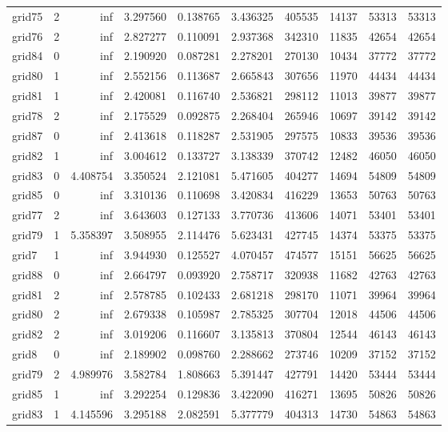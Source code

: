 \begin{longtable}{|l|r|r|r|r|r|r|r|r|r|}
grid75 & 2 & inf & 3.297560 & 0.138765 & 3.436325 & 405535 & 14137 & 53313 & 53313 \\
grid76 & 2 & inf & 2.827277 & 0.110091 & 2.937368 & 342310 & 11835 & 42654 & 42654 \\
grid84 & 0 & inf & 2.190920 & 0.087281 & 2.278201 & 270130 & 10434 & 37772 & 37772 \\
grid80 & 1 & inf & 2.552156 & 0.113687 & 2.665843 & 307656 & 11970 & 44434 & 44434 \\
grid81 & 1 & inf & 2.420081 & 0.116740 & 2.536821 & 298112 & 11013 & 39877 & 39877 \\
grid78 & 2 & inf & 2.175529 & 0.092875 & 2.268404 & 265946 & 10697 & 39142 & 39142 \\
grid87 & 0 & inf & 2.413618 & 0.118287 & 2.531905 & 297575 & 10833 & 39536 & 39536 \\
grid82 & 1 & inf & 3.004612 & 0.133727 & 3.138339 & 370742 & 12482 & 46050 & 46050 \\
grid83 & 0 & 4.408754 & 3.350524 & 2.121081 & 5.471605 & 404277 & 14694 & 54809 & 54809 \\
grid85 & 0 & inf & 3.310136 & 0.110698 & 3.420834 & 416229 & 13653 & 50763 & 50763 \\
grid77 & 2 & inf & 3.643603 & 0.127133 & 3.770736 & 413606 & 14071 & 53401 & 53401 \\
grid79 & 1 & 5.358397 & 3.508955 & 2.114476 & 5.623431 & 427745 & 14374 & 53375 & 53375 \\
grid7 & 1 & inf & 3.944930 & 0.125527 & 4.070457 & 474577 & 15151 & 56625 & 56625 \\
grid88 & 0 & inf & 2.664797 & 0.093920 & 2.758717 & 320938 & 11682 & 42763 & 42763 \\
grid81 & 2 & inf & 2.578785 & 0.102433 & 2.681218 & 298170 & 11071 & 39964 & 39964 \\
grid80 & 2 & inf & 2.679338 & 0.105987 & 2.785325 & 307704 & 12018 & 44506 & 44506 \\
grid82 & 2 & inf & 3.019206 & 0.116607 & 3.135813 & 370804 & 12544 & 46143 & 46143 \\
grid8 & 0 & inf & 2.189902 & 0.098760 & 2.288662 & 273746 & 10209 & 37152 & 37152 \\
grid79 & 2 & 4.989976 & 3.582784 & 1.808663 & 5.391447 & 427791 & 14420 & 53444 & 53444 \\
grid85 & 1 & inf & 3.292254 & 0.129836 & 3.422090 & 416271 & 13695 & 50826 & 50826 \\
grid83 & 1 & 4.145596 & 3.295188 & 2.082591 & 5.377779 & 404313 & 14730 & 54863 & 54863 \\

\end{longtable}
